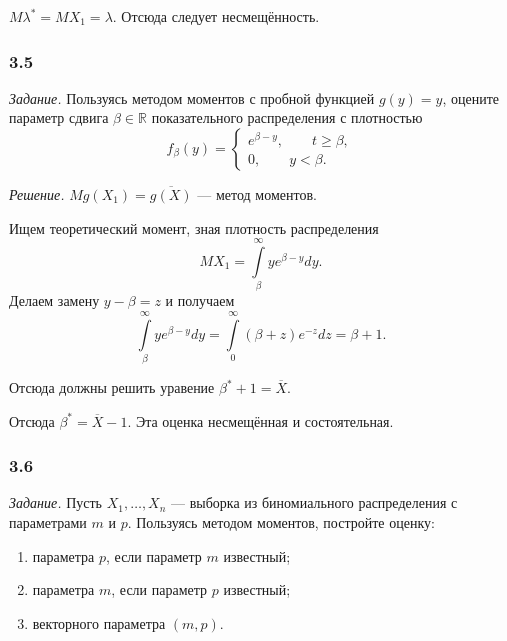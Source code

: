 $M \lambda^* = MX_1 = \lambda $.
Отсюда следует несмещённость.

\subsubsection*{3.5}

\textit{Задание.} Пользуясь методом моментов с пробной функцией $g \left( y \right) = y$,
оцените параметр сдвига $ \beta \in \mathbb{R}$ показательного распределения с плотностью
$$f_{ \beta } \left( y \right) =
  \begin{cases}
    e^{ \beta - y}, \qquad t \geq \beta, \\
    0, \qquad y < \beta.
  \end{cases}$$

\textit{Решение.} $Mg \left( X_1 \right) = \overline{g \left( X \right) }$ --- метод моментов.

Ищем теоретический момент, зная плотность распределения
$$MX_1 =
  \int \limits_{ \beta }^{ \infty } ye^{ \beta - y} dy.$$
Делаем замену $y - \beta = z$ и получаем
$$ \int \limits_{ \beta }^{ \infty } ye^{ \beta - y} dy =
  \int \limits_0^{ \infty } \left( \beta + z \right) e^{-z} dz =
  \beta + 1.$$

Отсюда должны решить уравение $ \beta^* + 1 = \overline{X}$.

Отсюда $ \beta^* = \overline{X} - 1$.
Эта оценка несмещённая и состоятельная.

\subsubsection*{3.6}

\textit{Задание.}
Пусть $X_1, \dotsc, X_n$ --- выборка из биномиального распределения с параметрами $m$ и $p$.
Пользуясь методом моментов, постройте оценку:
\begin{enumerate}[label=\alph*)]
  \item параметра $p$, если параметр $m$ известный;
  \item параметра $m$, если параметр $p$ известный;
  \item векторного параметра $ \left( m, p \right) $.
\end{enumerate}

